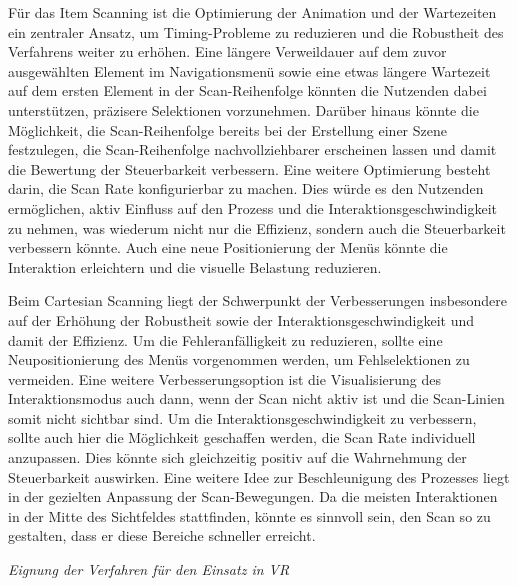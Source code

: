Für das Item Scanning ist die Optimierung der Animation und der Wartezeiten ein zentraler Ansatz, um Timing-Probleme zu reduzieren und die Robustheit des Verfahrens weiter zu erhöhen. Eine längere Verweildauer auf dem zuvor ausgewählten Element im Navigationsmenü sowie eine etwas längere Wartezeit auf dem ersten Element in der Scan-Reihenfolge könnten die Nutzenden dabei unterstützen, präzisere Selektionen vorzunehmen. Darüber hinaus könnte die Möglichkeit, die Scan-Reihenfolge bereits bei der Erstellung einer Szene festzulegen, die Scan-Reihenfolge nachvollziehbarer erscheinen lassen und damit die Bewertung der Steuerbarkeit verbessern.
Eine weitere Optimierung besteht darin, die Scan Rate konfigurierbar zu machen. Dies würde es den Nutzenden ermöglichen, aktiv Einfluss auf den Prozess und die Interaktionsgeschwindigkeit zu nehmen, was wiederum nicht nur die Effizienz, sondern auch die Steuerbarkeit verbessern könnte. Auch eine neue Positionierung der Menüs könnte die Interaktion erleichtern und die visuelle Belastung reduzieren.

Beim Cartesian Scanning liegt der Schwerpunkt der Verbesserungen insbesondere auf der Erhöhung der Robustheit sowie der Interaktionsgeschwindigkeit und damit der Effizienz. Um die Fehleranfälligkeit zu reduzieren, sollte eine Neupositionierung des Menüs vorgenommen werden, um Fehlselektionen zu vermeiden. Eine weitere Verbesserungsoption ist die Visualisierung des Interaktionsmodus auch dann, wenn der Scan nicht aktiv ist und die Scan-Linien somit nicht sichtbar sind. 
Um die Interaktionsgeschwindigkeit zu verbessern, sollte auch hier die Möglichkeit geschaffen werden, die Scan Rate individuell anzupassen. Dies könnte sich gleichzeitig positiv auf die Wahrnehmung der Steuerbarkeit auswirken. Eine weitere Idee zur Beschleunigung des Prozesses liegt in der gezielten Anpassung der Scan-Bewegungen. Da die meisten Interaktionen in der Mitte des Sichtfeldes stattfinden, könnte es sinnvoll sein, den Scan so zu gestalten, dass er diese Bereiche schneller erreicht. 

\textit{Eignung der Verfahren für den Einsatz in VR}

